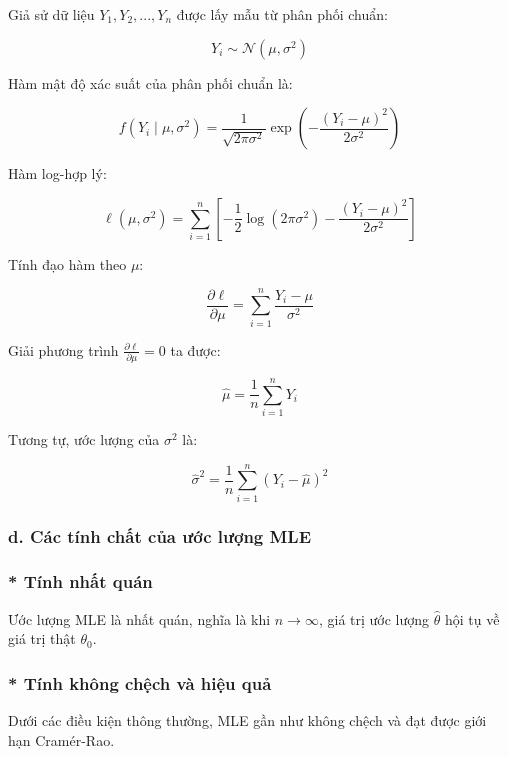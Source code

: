 Giả sử dữ liệu $Y_1, Y_2, ..., Y_n$ được lấy mẫu từ phân phối chuẩn:

\begin{equation}
Y_i \sim \mathcal{N}(\mu, \sigma^2)
\end{equation}

Hàm mật độ xác suất của phân phối chuẩn là:

\begin{equation}
f(Y_i \mid \mu, \sigma^2) = \frac{1}{\sqrt{2\pi\sigma^2}} \exp \left(-\frac{(Y_i - \mu)^2}{2\sigma^2} \right)
\end{equation}

Hàm log-hợp lý:

\begin{equation}
\ell(\mu, \sigma^2) = \sum_{i=1}^{n} \left[ -\frac{1}{2} \log (2\pi\sigma^2) - \frac{(Y_i - \mu)^2}{2\sigma^2} \right]
\end{equation}

Tính đạo hàm theo $\mu$:

\begin{equation}
\frac{\partial \ell}{\partial \mu} = \sum_{i=1}^{n} \frac{Y_i - \mu}{\sigma^2}
\end{equation}

Giải phương trình $\frac{\partial \ell}{\partial \mu} = 0$ ta được:

\begin{equation}
\hat{\mu} = \frac{1}{n} \sum_{i=1}^{n} Y_i
\end{equation}

Tương tự, ước lượng của $\sigma^2$ là:

\begin{equation}
\hat{\sigma}^2 = \frac{1}{n} \sum_{i=1}^{n} (Y_i - \hat{\mu})^2
\end{equation}

\subsubsection{d. Các tính chất của ước lượng MLE}

\subsubsection{* Tính nhất quán}
Ước lượng MLE là nhất quán, nghĩa là khi $n \to \infty$, giá trị ước lượng $\hat{\theta}$ hội tụ về giá trị thật $\theta_0$.

\subsubsection{* Tính không chệch và hiệu quả}
Dưới các điều kiện thông thường, MLE gần như không chệch và đạt được giới hạn Cramér-Rao.

